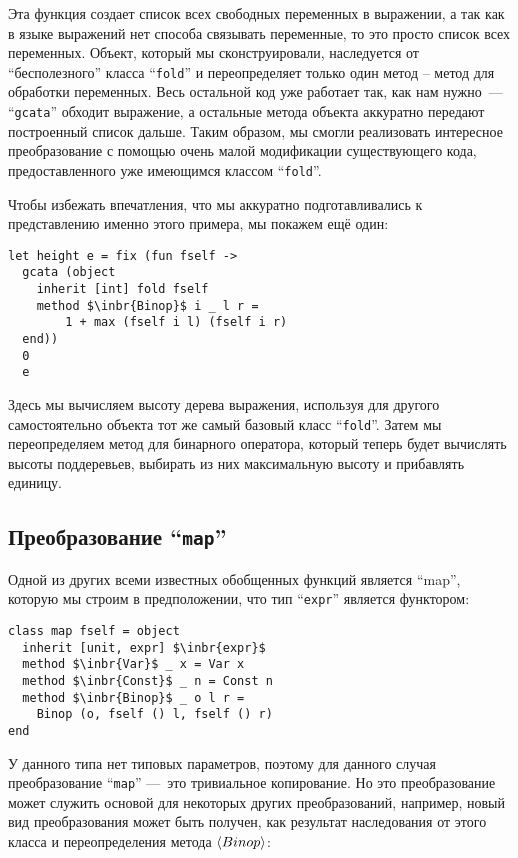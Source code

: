 \noindent Эта функция создает список всех свободных переменных в выражении, а так как в языке выражений нет способа связывать переменные, 
то это просто список всех переменных. Объект, который мы сконструировали, наследуется от ``бесполезного'' класса 
``\lstinline{fold}'' 
и переопределяет только один метод -- метод для обработки переменных.
Весь остальной код уже работает так, как нам нужно~---
``\lstinline{gcata}''
обходит выражение, 
а остальные метода объекта аккуратно передают построенный список дальше.
Таким образом, мы смогли реализовать интересное преобразование с помощью очень малой модификации существующего кода, 
предоставленного уже имеющимся классом ``\lstinline{fold}''. 

Чтобы избежать впечатления, что мы аккуратно подготавливались к
представлению именно этого примера, мы покажем ещё один:

\begin{lstlisting}
let height e = fix (fun fself ->
  gcata (object 
    inherit [int] fold fself
    method $\inbr{Binop}$ i _ l r = 
        1 + max (fself i l) (fself i r) 
  end)) 
  0 
  e
\end{lstlisting}

\noindent Здесь мы вычисляем высоту дерева выражения, используя  для другого самостоятельно объекта тот же самый базовый класс ``\lstinline{fold}''.
Затем мы переопределяем метод для бинарного оператора, который теперь будет вычислять высоты поддеревьев, выбирать из них максимальную высоту и прибавлять единицу.

\subsection{Преобразование ``\lstinline{map}''} 

Одной из других всеми известных обобщенных функций является ``map'', которую мы строим в предположении, что тип ``\lstinline{expr}'' является функтором:

\begin{lstlisting}
class map fself = object 
  inherit [unit, expr] $\inbr{expr}$
  method $\inbr{Var}$ _ x = Var x
  method $\inbr{Const}$ _ n = Const n
  method $\inbr{Binop}$ _ o l r = 
    Binop (o, fself () l, fself () r)
end
\end{lstlisting}

\noindent У данного типа нет типовых параметров, поэтому для данного случая преобразование ``\lstinline{map}'' ---~это тривиальное копирование. Но это преобразование может служить основой для некоторых других преобразований, например, 
новый вид преобразования может быть получен, как результат наследования от этого класса и переопределения метода $\left<Binop\right>$:

